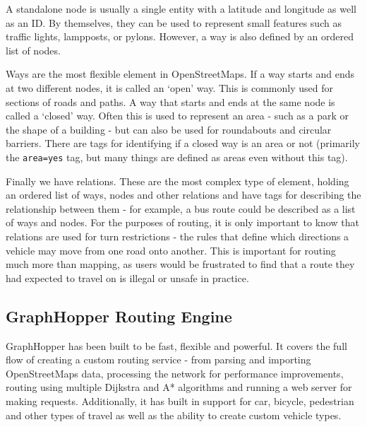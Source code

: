 \documentclass[ %
                    author={Alexander Hill},
                supervisor={Dr. Benjamin Sach},
                    degree={MEng},
                     title={MARMOSET},
                  subtitle={Multi-Agent Route Management using Online Simulation for Efficient Transportation},
                      type={research},
                      year={2016} ]{dissertation}
\begin{document}
A standalone node is usually a single entity with a latitude and longitude as
well as an ID. By themselves, they can be used to represent small features such
as traffic lights, lampposts, or pylons. However, a way is also defined by an
ordered list of nodes.

Ways are the most flexible element in OpenStreetMaps. If a way starts and ends
at two different nodes, it is called an `open' way. This is commonly used for
sections of roads and paths. A way that starts and ends at the same node is
called a `closed' way. Often this is used to represent an area - such as a park
or the shape of a building - but can also be used for roundabouts and circular
barriers. There are tags for identifying if a closed way is an area or not
(primarily the \texttt{area=yes} tag, but many things are defined as areas even
without this tag).

Finally we have relations. These are the most complex type of element, holding
an ordered list of ways, nodes and other relations and have tags for describing
the relationship between them - for example, a bus route could be described as a
list of ways and nodes. For the purposes of routing, it is only important to
know that relations are used for turn restrictions - the rules that define which
directions a vehicle may move from one road onto another. This is important for
routing much more than mapping, as users would be frustrated to find that a
route they had expected to travel on is illegal or unsafe in practice.

\subsection{GraphHopper Routing Engine}

GraphHopper has been built to be fast, flexible and powerful. It covers the full
flow of creating a custom routing service - from parsing and importing
OpenStreetMaps data, processing the network for performance improvements,
routing using multiple Dijkstra and A* algorithms and running a web server for
making requests. Additionally, it has built in support for car, bicycle,
pedestrian and other types of travel as well as the ability to create custom
vehicle types.
\end{document}
